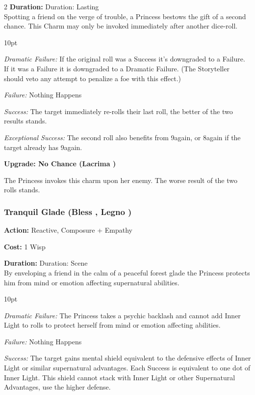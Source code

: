 \begin{multicols}{2}
\noindent \textbf{Duration:} Duration: Lasting \\

Spotting a friend on the verge of trouble, a Princess bestows the gift of a second chance. This Charm may only be invoked immediately after another dice-roll. 

\begin{myindentpar}{10pt}

\emph{Dramatic Failure:} If the original roll was a Success it's downgraded to a Failure. If it was a Failure it is downgraded to a Dramatic Failure. (The Storyteller should veto any attempt to penalize a foe with this effect.)

\emph{Failure:} Nothing Happens 

\emph{Success:} The target immediately re-rolls their last roll, the better of the two results stands. 

\emph{Exceptional Success:} The second roll also benefits from 9again, or 8again if the target already has 9again.

\textbf{Upgrade: No Chance (Lacrima \textbullet\textbullet)}

The Princess invokes this charm upon her enemy. The worse result of the two rolls stands. 

\end{myindentpar}

\subsubsection*{Tranquil Glade (Bless \textbullet\textbullet, Legno \textbullet\textbullet\textbullet)}

\noindent \textbf{Action:} Reactive, Composure + Empathy

\noindent \textbf{Cost:} 1 Wisp

\noindent \textbf{Duration:} Duration: Scene \\

By enveloping a friend in the calm of a peaceful forest glade the Princess protects him from mind or emotion affecting supernatural abilities. 

\begin{myindentpar}{10pt}

\emph{Dramatic Failure:} The Princess takes a psychic backlash and cannot add Inner Light to rolls to protect herself from mind or emotion affecting abilities. 

\emph{Failure:} Nothing Happens 

\emph{Success:} The target gains mental shield equivalent to the defensive effects of Inner Light or similar supernatural advantages. Each Success is equivalent to one dot of Inner Light. This shield cannot stack with Inner Light or other Supernatural Advantages, use the higher defense.


\end{myindentpar}
\end{multicols}
